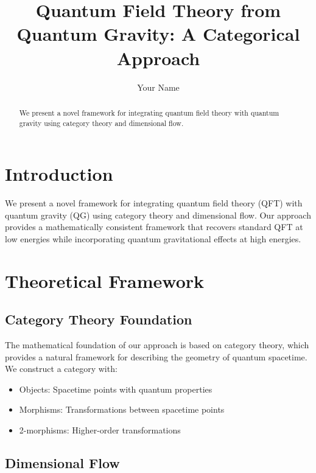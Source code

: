 \documentclass[prd,superscriptaddress,showpacs]{revtex4-1}
\begin{document}
\title{Quantum Field Theory from Quantum Gravity: A Categorical Approach}

\author{Your Name}

\begin{abstract}
We present a novel framework for integrating quantum field theory with quantum gravity using category theory and dimensional flow.
\end{abstract}


\maketitle

\section{Introduction}

We present a novel framework for integrating quantum field theory (QFT) with quantum gravity (QG) using category theory and dimensional flow. Our approach provides a mathematically consistent framework that recovers standard QFT at low energies while incorporating quantum gravitational effects at high energies.

\section{Theoretical Framework}

\subsection{Category Theory Foundation}

The mathematical foundation of our approach is based on category theory, which provides a natural framework for describing the geometry of quantum spacetime. We construct a category with:

\begin{itemize}
\item Objects: Spacetime points with quantum properties
\item Morphisms: Transformations between spacetime points
\item 2-morphisms: Higher-order transformations
\end{itemize}

\subsection{Dimensional Flow}
\end{document}
